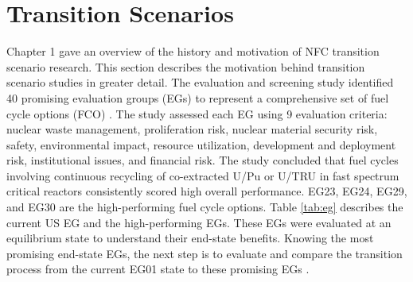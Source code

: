 \section{Transition Scenarios}
Chapter 1 gave an overview of the history and motivation of 
\gls{NFC} transition scenario research.
This section describes the motivation behind transition 
scenario studies in greater detail.
The evaluation and screening study identified 40 promising 
evaluation groups (\glspl{EG}) to represent a comprehensive set of 
fuel cycle options (\gls{FCO}) \cite{wigeland_nuclear_2014}. 
The study assessed each EG using 
9 evaluation criteria: nuclear waste management, 
proliferation risk, nuclear material security risk, 
safety, environmental impact, resource utilization, 
development and deployment risk, institutional issues, and 
financial risk.  
The study concluded that fuel cycles
involving continuous recycling of co-extracted U/Pu or U/TRU in 
fast spectrum critical reactors consistently scored high overall 
performance.
EG23, EG24, EG29, and EG30 are the high-performing fuel cycle options.
Table \ref{tab:eg} describes the current US EG
and the high-performing \glspl{EG}. 
These \glspl{EG} were evaluated at an equilibrium state to 
understand their end-state benefits.
Knowing the most promising end-state \glspl{EG}, 
the next step is to evaluate and compare the transition process 
from the current EG01 
state to these promising \glspl{EG} \cite{feng_standardized_2016}. 

